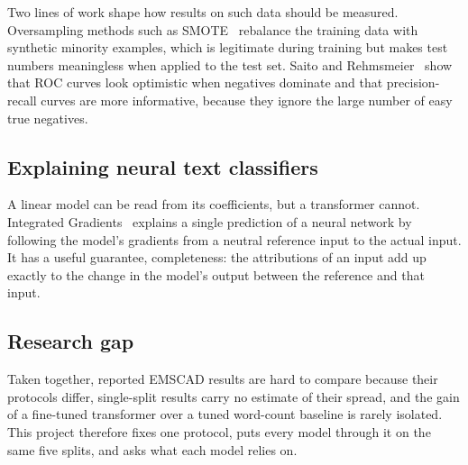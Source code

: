 Two lines of work shape how results on such data should be measured. Oversampling methods such
as SMOTE~\cite{chawla2002} rebalance the training data with synthetic minority
examples, which is legitimate during training but makes test numbers meaningless when applied to
the test set. Saito and Rehmsmeier~\cite{saito2015} show that ROC curves look
optimistic when negatives dominate and that precision-recall curves are more informative, because
they ignore the large number of easy true negatives.

\subsection{Explaining neural text classifiers}

A linear model can be read from its coefficients, but a transformer cannot. Integrated
Gradients~\cite{sundararajan2017} explains a single prediction of a neural network by following
the model's gradients from a neutral reference input to the actual input. It has a useful
guarantee, completeness: the attributions of an input add up exactly to the change in the model's
output between the reference and that input.

\subsection{Research gap}

Taken together, reported EMSCAD results are hard to compare because their protocols differ,
single-split results carry no estimate of their spread, and the gain of a fine-tuned transformer
over a tuned word-count baseline is rarely isolated. This project therefore fixes one protocol,
puts every model through it on the same five splits, and asks what each model relies on.
